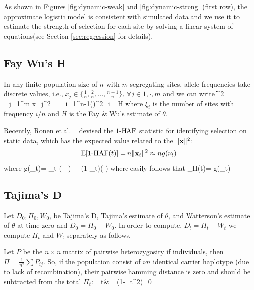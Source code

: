\documentclass[11pt]{article}
\begin{document}
As shown in Figures \ref{fig:dynamic-weak} and \ref{fig:dynamic-strong} (first 
row), the approximate logistic model is consistent with 
simulated data and we 
use it to estimate the strength of selection for 
each site by solving a linear system of equations(see Section 
\ref{sec:regression} for details).

\subsection{Fay Wu's H}\label{app:h}
In any finite population size of $n$ with $m$ segregating sites, 
allele frequencies take 
discrete values, i.e.,  $x_j \in 
\{\frac{1}{n},\frac{2}{n},\ldots,\frac{n-1}{n}\}, \ \forall j \in{1,\cdot,m}$ 
and we can write
\beq
\|\bfx\|^2= \sum_{j=1}^{m} x_j^2 = 
\sum_{i=1}^{n-1}\left(\right)^2\xi_i= 
H 
\eeq
where $\xi_i$ is the number of sites with frequency $i/n$ and $H$ is the 
Fay \& Wu's estimate of $\theta$.

Recently, Ronen et al. ~\cite{ronen2015predicting} devised the $1\text{-HAF}$ 
statistic for identifying selection on static data, which has the expected 
value related to the $\|{\mathbf x}\|^2$:
\begin{equation} 
{\mathbb E}[1\text{-HAF}(t)]= n\| {\mathbf x}_t\|^2\approx ng(\nu_t)
\end{equation} 
where
\beq
g(\nu_t)= \theta \nu_t \left( - \right) +
\theta (1-\nu_t)\left(-\right)
\label{eq:hafscorepooled}
\eeq
where easily follows that
\beq
\theta_H(t)= g(\nu_t)
\eeq

\subsection{Tajima's D}\label{app:td}
Let $D_0, \Pi_0, W_0$, be Tajima's D, Tajima's estimate of  $\theta$, and 
Watterson's estimate of $\theta$ at time zero and $D_0=\Pi_0 - W_0$.
In order to compute, $D_t=\Pi_t - W_t$ we compute $\Pi_t$ and $W_t$ separately 
as follows.

Let $P$ be the $n \times n$ matrix of pairwise heterozygosity if individuals, 
then $\Pi=\frac{1}{n^2}\sum P_{ij}$. So, if the population consist of $\nu n$ 
identical carrier haplotype (due to lack of recombination), their pairwise 
hamming distance is zero and should be subtracted from the total $\Pi_t$:
\beq
\Pi_t&= (1-\nu_t^2)\Pi_0 
\eeq
\end{document}
